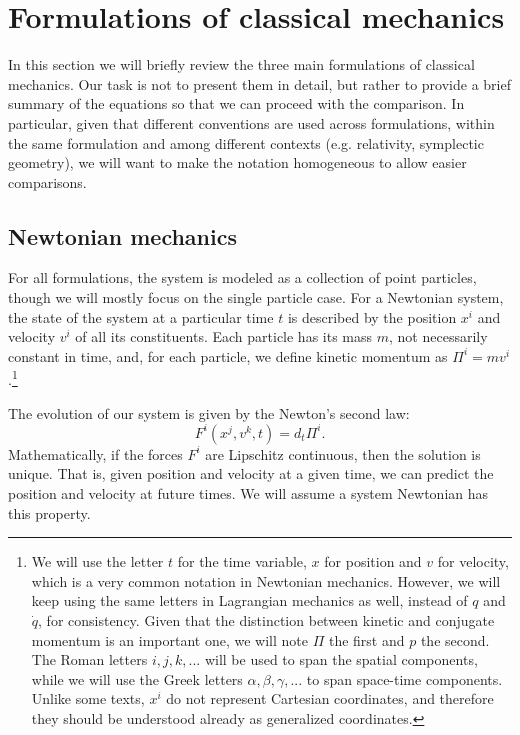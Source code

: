 \section{Formulations of classical mechanics}

In this section we will briefly review the three main formulations of classical mechanics. Our task is not to present them in detail, but rather to provide a brief summary of the equations so that we can proceed with the comparison. In particular, given that different conventions are used across formulations, within the same formulation and among different contexts (e.g. relativity, symplectic geometry), we will want to make the notation homogeneous to allow easier comparisons.

\subsection{Newtonian mechanics}

For all formulations, the system is modeled as a collection of point particles, though we will mostly focus on the single particle case. For a Newtonian system, the state of the system at a particular time $t$ is described by the position $x^i$ and velocity $v^i$ of all its constituents. Each particle has its mass $m$, not necessarily constant in time, and, for each particle, we define kinetic momentum as $\Pi^i = m v^i$.\footnote{We will use the letter $t$ for the time variable, $x$ for position and $v$ for velocity, which is a very common notation in Newtonian mechanics. However, we will keep using the same letters in Lagrangian mechanics as well, instead of $q$ and $\dot{q}$, for consistency. Given that the distinction between kinetic and conjugate momentum is an important one, we will note $\Pi$ the first and $p$ the second. The Roman letters $i,j,k,...$ will be used to span the spatial components, while we will use the Greek letters $\alpha, \beta, \gamma, ...$ to span space-time components. Unlike some texts, $x^i$ do not represent Cartesian coordinates, and therefore they should be understood already as generalized coordinates.}

The evolution of our system is given by the Newton's second law:
\begin{equation}\label{rp-cm-NewtonsSecondLaw}
	F^i(x^j, v^k, t) = d_t \Pi^i.
\end{equation}
Mathematically, if the forces $F^i$ are Lipschitz continuous, then the solution is unique. That is, given position and velocity at a given time, we can predict the position and velocity at future times. We will assume a system Newtonian has this property.

